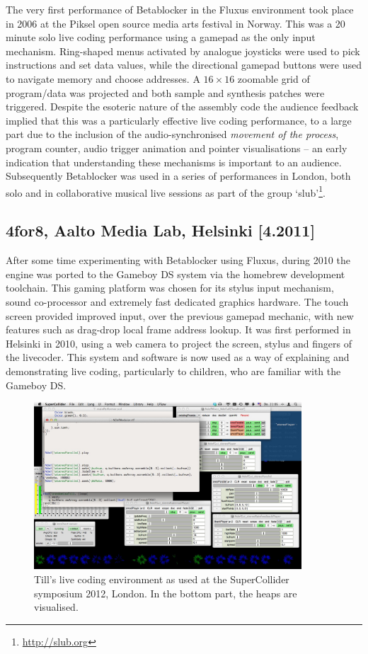 \documentclass[letterpaper, 12pt]{article}
\begin{document}
The very first performance of Betablocker in the Fluxus environment took place in 2006 at the Piksel open source media arts festival in Norway. This was a 20 minute solo live coding performance using a gamepad as the only input mechanism. Ring-shaped menus activated by analogue joysticks were used to pick instructions and set data values, while the directional gamepad buttons were used to navigate memory and choose addresses. A $16\times16$ zoomable grid of program/data was projected and both sample and synthesis patches were triggered. Despite the esoteric nature of the assembly code the audience feedback implied that this was a particularly effective live coding performance, to a large part due to the inclusion of the audio-synchronised \emph{movement of the process}, program counter, audio trigger animation and pointer visualisations -- an early indication that understanding these mechanisms is important to an audience. Subsequently Betablocker was used in a series of performances in London, both solo and in collaborative musical live sessions as part of the group `slub'\footnote{\url{http://slub.org}}.

\subsection{4for8, Aalto Media Lab, Helsinki [4.2011]}
\label{sub:4for8}

After some time experimenting with Betablocker using Fluxus, during 2010 the engine was ported to the Gameboy DS system via the homebrew development toolchain. This gaming platform was chosen for its stylus input mechanism, sound co-processor and extremely fast dedicated graphics hardware. The touch screen provided improved input, over the previous gamepad mechanic, with new features such as drag-drop local frame address lookup. It was first performed in Helsinki in 2010, using a web camera to project the screen, stylus and fingers of the livecoder. This system and software is now used as a way of explaining and demonstrating live coding, particularly to children, who are familiar with the Gameboy DS.
\parskip 18pt

\begin{figure}
	\centering
\includegraphics[width=10cm]{2012-SuperColliderSymposiumLiveCodingEnvironment-tills}
	\caption{Till's live coding environment as used at the SuperCollider symposium 2012, London. In the bottom part, the heaps are visualised.}
	\label{fig:fig_2012-SuperColliderSymposiumLiveCodingEnvironment-till}
\end{figure}
\end{document}
